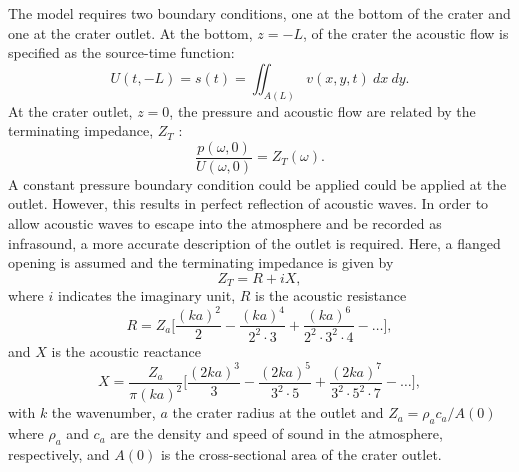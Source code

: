 \documentclass[10pt]{article}
\begin{document}
The model requires two boundary conditions, one at the bottom of the crater and one at the crater outlet. At the bottom, $z=-L$, of the crater the acoustic flow is specified as the source-time function:
\begin{equation}
U(t,-L) = s(t) = \iint_{A(L)} v(x,y,t)~dx~dy.
\label{eq:volumetric flow rate}
\end{equation}
At the crater outlet, $z=0$, the pressure and acoustic flow are related by the terminating impedance, $Z_T$ \citep{Rossing2004}:
\begin{equation}
\frac{p(\omega,0)}{U(\omega,0)} = Z_T(\omega).
\end{equation}
A constant pressure boundary condition could be applied could be applied at the outlet. However, this results in perfect reflection of acoustic waves. In order to allow acoustic waves to escape into the atmosphere and be recorded as infrasound, a more accurate description of the outlet is required. Here, a flanged opening is assumed \citep{Olson1957,Kinsler2000,Rossing2004} and the terminating impedance is given by  \citep{Rossing2004}
\begin{equation}
Z_T = R + i X,
\label{eq:terminating impedance}  
\end{equation}
 where $i$ indicates the imaginary unit, $R$ is the acoustic resistance
\begin{equation}
R = Z_a \bigg[ \frac{(ka)^2}{2} - \frac{(ka)^4}{2^2 \cdot 3} + \frac{(ka)^6}{2^2 \cdot 3^2 \cdot 4} - \hdots \bigg],
\label{eq:acoustic resistance}
\end{equation}
 and $X$ is the acoustic reactance
\begin{equation}
X = \frac{Z_a}{\pi (ka)^2} \bigg[ \frac{(2ka)^3}{3} - \frac{(2ka)^5}{3^2 \cdot 5} + \frac{(2ka)^7}{3^2 \cdot 5^2 \cdot 7} - \hdots \bigg],   
\label{eq:acoustic reactance}
\end{equation}
 with $k$ the wavenumber, $a$ the crater radius at the outlet and $Z_a = \rho_a c_a/A(0)$ where $\rho_a$ and $c_a$ are the density and speed of sound in the atmosphere, respectively, and $A(0)$ is the cross-sectional area of the crater outlet. 
\end{document}
